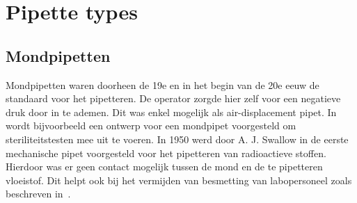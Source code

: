 \section{Pipette types}
\subsection{Mondpipetten}
Mondpipetten waren doorheen de 19e en in het begin van de 20e eeuw de standaard voor het pipetteren. De operator zorgde hier zelf voor een negatieve druk door in te ademen. Dit was enkel mogelijk als air-displacement pipet. In\ \cite{RN21} wordt bijvoorbeeld een ontwerp voor een mondpipet voorgesteld om steriliteitstesten mee uit te voeren. In 1950 werd door A. J. Swallow in\cite{RN18} de eerste mechanische pipet voorgesteld voor het pipetteren van radioactieve stoffen. Hierdoor was er geen contact mogelijk tussen de mond en de te pipetteren vloeistof. Dit helpt ook bij het vermijden van besmetting van labopersoneel zoals beschreven in\ \cite{RN20}.
